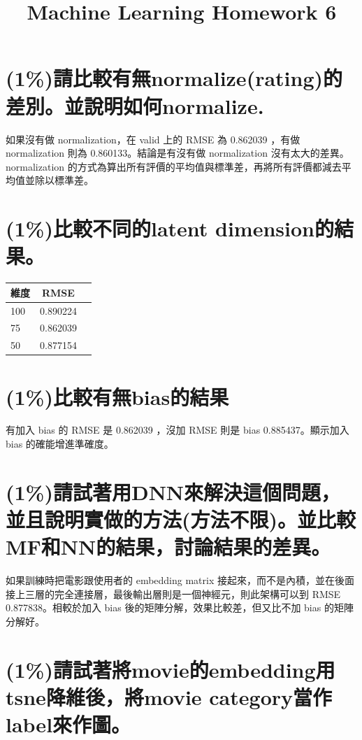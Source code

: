 \documentclass[fleqn,a4paper,12pt]{article}
\title{Machine Learning Homework 6}
\date{}
\begin{document}
\thispagestyle{fancy}

\section{(1\%)請比較有無normalize(rating)的差別。並說明如何normalize.}

如果沒有做 normalization，在 valid 上的 RMSE 為 0.862039 ，有做 normalization 則為 0.860133。結論是有沒有做 normalization 沒有太大的差異。normalization 的方式為算出所有評價的平均值與標準差，再將所有評價都減去平均值並除以標準差。

\section{(1\%)比較不同的latent dimension的結果。}

\begin{tabular}[c]{| l | c | r |}
  \hline
  維度 & RMSE \\ \hline
  100 & 0.890224 \\ \hline
  75 & 0.862039 \\ \hline
  50 & 0.877154 \\ \hline
\end{tabular}

\section{(1\%)比較有無bias的結果}

有加入 bias 的 RMSE 是 0.862039 ，沒加 RMSE 則是 bias 0.885437。顯示加入 bias 的確能增進準確度。

\section{(1\%)請試著用DNN來解決這個問題，並且說明實做的方法(方法不限)。並比較MF和NN的結果，討論結果的差異。}

如果訓練時把電影跟使用者的 embedding matrix 接起來，而不是內積，並在後面接上三層的完全連接層，最後輸出層則是一個神經元，則此架構可以到 RMSE 0.877838。相較於加入 bias 後的矩陣分解，效果比較差，但又比不加 bias 的矩陣分解好。

\section{(1\%)請試著將movie的embedding用tsne降維後，將movie category當作label來作圖。}
\end{document}
